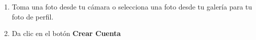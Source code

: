 \begin{enumerate}
	\item Toma una foto desde tu cámara o selecciona una foto desde tu galería para tu foto de perfil.
	
	\item Da clic en el botón \textbf{Crear Cuenta}

\end{enumerate}

